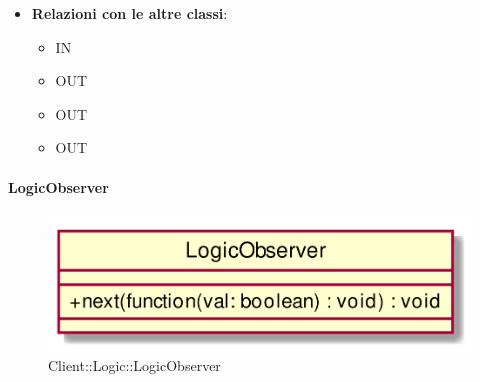 \begin{itemize}
\begin{itemize}
	\end{itemize}
	\item \textbf{Relazioni con le altre classi}:
	\begin{itemize}
		\item IN \hyperlink{DataArrivedSubject_label}{}
		\item OUT \hyperlink{HttpError_label}{}
		\item OUT \hyperlink{HttpPromise_label}{}
		\item OUT \hyperlink{DataArrivedSubject_label}{}
	\end{itemize}
\end{itemize}
\FloatBarrier

\hypertarget{LogicObserver_label}{\paragraph{LogicObserver}}
\begin{figure}[h]
	\centering
	\includegraphics[width=\textwidth,height=\textheight,keepaspectratio]{images/ClassLogicObserver.png}
	\caption{Client::Logic::LogicObserver}
\end{figure}
